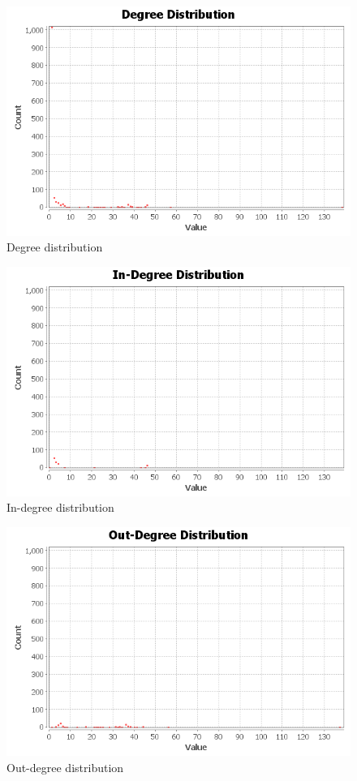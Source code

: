 \documentclass{article}
\begin{document}
\graphicspath{{q3/avgDegree/}}
\begin{figure}
  \centering
  \caption{Degree distribution}
  \includegraphics[scale=.5]{degree-distribution.png}
\end{figure}
\begin{figure}
  \centering
  \caption{In-degree distribution}
  \includegraphics[scale=.5]{indegree-distribution.png}
\end{figure}
\begin{figure}
  \centering
  \caption{Out-degree distribution}
  \includegraphics[scale=.5]{outdegree-distribution.png}
\end{figure}
\end{document}
